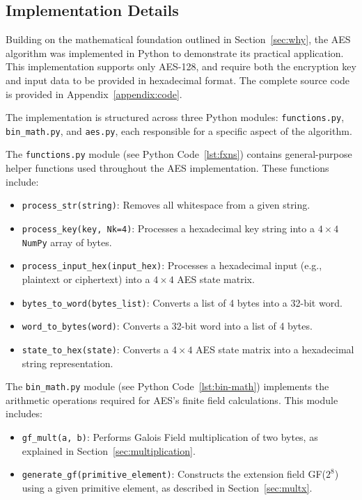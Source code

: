 \subsection{Implementation Details}

Building on the mathematical foundation outlined in Section~\ref{sec:why}, the AES algorithm was implemented in Python to demonstrate its practical application.
This implementation supports only AES-128, and require both the encryption key and input data to be provided in hexadecimal format. 
The complete source code is provided in Appendix~\ref{appendix:code}.

The implementation is structured across three Python modules: \texttt{functions.py}, \texttt{bin\_math.py}, and \texttt{aes.py}, each responsible for a specific aspect of the algorithm.

The \texttt{functions.py} module (see Python Code~\ref{lst:fxns}) contains general-purpose helper functions used throughout the AES implementation. 
These functions include:
\begin{itemize}
    \item \texttt{process\_str(string)}: Removes all whitespace from a given string.
    \item \texttt{process\_key(key, Nk=4)}: Processes a hexadecimal key string into a $4\times4$ \texttt{NumPy} array of bytes.
    \item \texttt{process\_input\_hex(input\_hex)}: Processes a hexadecimal input (e.g., plaintext or ciphertext) into a $4\times4$ AES state matrix.
    \item \texttt{bytes\_to\_word(bytes\_list)}: Converts a list of 4 bytes into a 32-bit word.
    \item \texttt{word\_to\_bytes(word)}: Converts a 32-bit word into a list of 4 bytes.
    \item \texttt{state\_to\_hex(state)}: Converts a $4\times4$ AES state matrix into a hexadecimal string representation.
\end{itemize}

The \texttt{bin\_math.py} module (see Python Code~\ref{lst:bin-math}) implements the arithmetic operations required for AES's finite field calculations. 
This module includes:
\begin{itemize}
    \item \texttt{gf\_mult(a, b)}: Performs Galois Field multiplication of two bytes, as explained in Section~\ref{sec:multiplication}.
    \item \texttt{generate\_gf(primitive\_element)}: Constructs the extension field GF($2^8$) using a given primitive element, as described in Section~\ref{sec:multx}.
\end{itemize}

